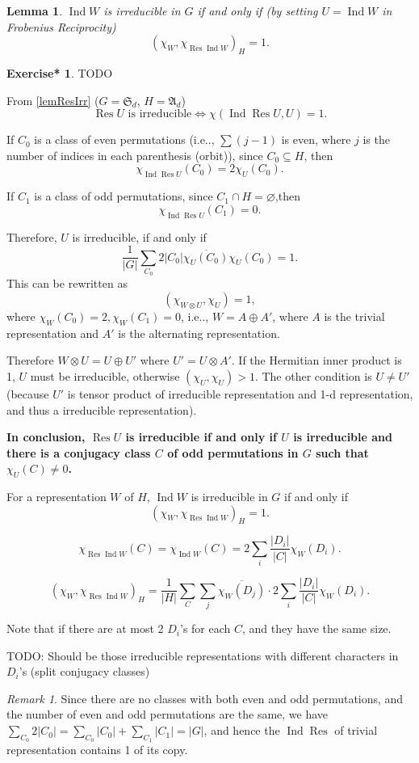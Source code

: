 \documentclass[12pt, letterpaper]{article}
\makeatletter
\newcommand{\Res}{\operatorname{Res}}
\newcommand{\Ind}{\operatorname{Ind}}
\newcommand\ie{i.e\@ifnextchar.{}{.\@}}
\newcommand{\red}[1]{{\color{red} #1}}
\newcommand{\card}[1]{\left\lvert #1 \right\rvert}
\newcommand{\conj}{\overline}
\renewcommand{\emptyset}{\varnothing}
\newtheorem{lem}[prop]{Lemma}
\theoremstyle{definition}
\theoremstyle{remark}
\newtheorem*{rem*}{Remark}
\theoremstyle{definition}
\newtheorem{exe*}[exe]{Exercise*}
\theoremstyle{plain}
\numberwithin{equation}{section}
\makeatother
\begin{document}
	\begin{lem}
		$\Ind W$ is irreducible in $G$ if and only if (by setting $U=\Ind W$ in Frobenius Reciprocity)
		\[(\chi_W,\chi_{\Res\Ind W})_H=1.\]
	\end{lem}
	\begin{exe*}
		\red{TODO}
		
		From \ref{lemResIrr}
		($G=\mathfrak{S}_d$,
		$H=\mathfrak{A}_d$)
		\[\Res U \text{ is irreducible}
		\iff
		 \chi(\Ind \Res U,U)=1.\]
		 
		If $C_0$ is a class of
		even permutations (\ie, $\sum (j-1)$
		is even, where $j$ is the number of indices in each parenthesis (orbit)),
		since $C_0\subseteq H$, then
		\[\chi_{\Ind \Res U}(C_0)=2\chi_U(C_0).\]
		
		If $C_1$ is a class of odd permutations, since $C_1\cap H=\emptyset$,then
		\[ \chi_{\Ind \Res U}(C_1)=0.\]
		
		Therefore,
		$U$ is irreducible, if and only if
		\[ \frac{1}{\card{G}}\sum_{C_0}2\card{C_0}\conj{\chi_U(C_0)}\chi_U(C_0)=1.\]
		This can be rewritten as
		\[(\chi_{W\otimes U},\chi_U)=1,\]
		where $\chi_W(C_0)=2,\chi_W(C_1)=0$, \ie, $W=A\oplus A'$,
		where $A$ is the trivial representation and $A'$ is the alternating representation.
		
		Therefore $W\otimes U=U\oplus U'$ where $U'=U\otimes A'$.
		If the Hermitian inner product is 1, $U$ must be irreducible,
		otherwise $(\chi_U,\chi_U)>1$. The other condition is $U\ne U'$
		(because $U'$ is tensor product of irreducible representation and 1-d representation,
		and thus a irreducible representation).
		
		\textbf{In conclusion, $\Res U$ is irreducible if and only if $U$ is irreducible
		and there is a conjugacy class $C$ of odd permutations in $G$ such that
		$\chi_U(C)\ne0$.}
	
		For a representation $W$ of $H$,
		$\Ind W$ is irreducible in $G$ if and only if
		\[(\chi_W,\chi_{\Res\Ind W})_H=1.\]
		
		\[\chi_{\Res\Ind W}(C)=\chi_{\Ind W}(C)=2\sum_i \frac{\card{D_i}}{\card{C}}\chi_W(D_i).
		\]
		
		\[(\chi_W,\chi_{\Res\Ind W})_H=\frac{1}{\card{H}}\sum_C \sum_j \conj{\chi_W(D_j)}\cdot 2\sum_i \frac{\card{D_i}}{\card{C}}\chi_W(D_i).
		\]
		
		Note that if there are at most 2 $D_i$'s for each $C$,
		and they have the same size.

		\red{TODO: Should be those irreducible representations with different characters in $D_i$'s (split conjugacy classes)}
	\end{exe*}
	\begin{rem*}
		Since there are no classes with both even and odd permutations,
		and the number of even and odd permutations are the same,
		we have $\sum_{C_0}2\card{C_0}=\sum_{C_0}\card{C_0}+\sum_{C_1}\card{C_1}=\card{G}$, and hence
		the $\Ind \Res$ of trivial representation contains 1 of its copy.
	\end{rem*}
\end{document}
